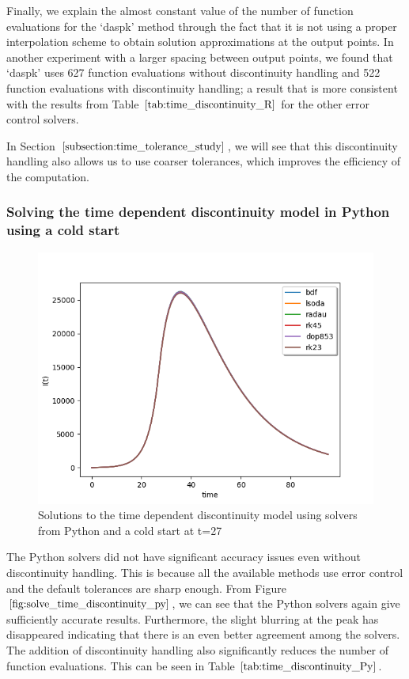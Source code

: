 Finally, we explain the almost constant value of the number of function evaluations for the `daspk' method through the fact that it is not using a proper interpolation scheme to obtain solution approximations at the output points. In another experiment with a larger spacing between output points, we found that `daspk' uses 627 function evaluations without discontinuity handling and 522 function evaluations with discontinuity handling; a result that is more consistent with the results from Table $\ref{tab:time_discontinuity_R}$ for the other error control solvers.

In Section $\ref{subsection:time_tolerance_study}$, we will see that this discontinuity handling also allows us to use coarser tolerances, which improves the efficiency of the computation.

\subsubsection{Solving the time dependent discontinuity model in Python using a cold start} 
\begin{figure}[H]
\centering
\includegraphics[width=0.7\linewidth]{./figures/solve_time_discontinuity_py}
\caption{Solutions to the time dependent discontinuity model using solvers from Python and a cold start at t=27}
\label{fig:solve_time_discontinuity_py}
\end{figure}
The Python solvers did not have significant accuracy issues even without discontinuity handling. This is because all the available methods use error control and the default tolerances are sharp enough. From Figure $\ref{fig:solve_time_discontinuity_py}$, we can see that the Python solvers again give sufficiently accurate results. Furthermore, the slight blurring at the peak has disappeared indicating that there is an even better agreement among the solvers. The addition of discontinuity handling also significantly reduces the number of function evaluations. This can be seen in Table $\ref{tab:time_discontinuity_Py}$.

